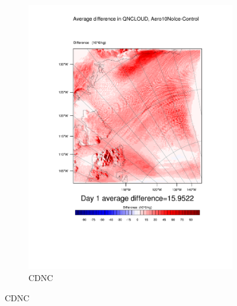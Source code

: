 \begin{figure}[hb]
\begin{subfigure}{0.48\textwidth}
		\includegraphics[width=\textwidth]{results/aero10ni/diff_Aero10NoIce_QNCLOUD_Day1.pdf}
		\caption{CDNC}
		\label{subfig:CDNCr4Day1}
	\end{subfigure}
	

\end{figure}
